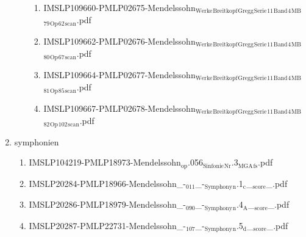 \documentclass[11pt]{article}
\begin{document}
\begin{enumerate}
\begin{enumerate}
\begin{enumerate}
\item IMSLP109660-PMLP02675-Mendelssohn$_{\text{Werke}}$$_{\text{Breitkopf}}$$_{\text{Gregg}}$$_{\text{Serie}}$$_{\text{11}}$$_{\text{Band}}$$_{\text{4}}$$_{\text{MB}}$$_{\text{79}}$$_{\text{Op}}$$_{\text{62}}$$_{\text{scan}}$.pdf
\label{sec-1-1-1-1-44-45-2-2-5}

\item IMSLP109662-PMLP02676-Mendelssohn$_{\text{Werke}}$$_{\text{Breitkopf}}$$_{\text{Gregg}}$$_{\text{Serie}}$$_{\text{11}}$$_{\text{Band}}$$_{\text{4}}$$_{\text{MB}}$$_{\text{80}}$$_{\text{Op}}$$_{\text{67}}$$_{\text{scan}}$.pdf
\label{sec-1-1-1-1-44-45-2-2-6}

\item IMSLP109664-PMLP02677-Mendelssohn$_{\text{Werke}}$$_{\text{Breitkopf}}$$_{\text{Gregg}}$$_{\text{Serie}}$$_{\text{11}}$$_{\text{Band}}$$_{\text{4}}$$_{\text{MB}}$$_{\text{81}}$$_{\text{Op}}$$_{\text{85}}$$_{\text{scan}}$.pdf
\label{sec-1-1-1-1-44-45-2-2-7}

\item IMSLP109667-PMLP02678-Mendelssohn$_{\text{Werke}}$$_{\text{Breitkopf}}$$_{\text{Gregg}}$$_{\text{Serie}}$$_{\text{11}}$$_{\text{Band}}$$_{\text{4}}$$_{\text{MB}}$$_{\text{82}}$$_{\text{Op}}$$_{\text{102}}$$_{\text{scan}}$.pdf
\label{sec-1-1-1-1-44-45-2-2-8}
\end{enumerate}
\end{enumerate}

\item symphonien
\label{sec-1-1-1-1-44-45-3}
\begin{enumerate}
\item IMSLP104219-PMLP18973-Mendelssohn$_{\text{op}}$.056$_{\text{Sinfonie}}$$_{\text{Nr}}$.3$_{\text{MGA}}$$_{\text{fs}}$.pdf
\label{sec-1-1-1-1-44-45-3-1}

\item IMSLP20284-PMLP18966-Mendelssohn\_-$_{\text{011}}$\_-$_{\text{Symphony}}$$_{\text{n}}$.1$_{\text{c}}$\_$_{\text{score}}$\_.pdf
\label{sec-1-1-1-1-44-45-3-2}

\item IMSLP20286-PMLP18979-Mendelssohn\_-$_{\text{090}}$\_-$_{\text{Symphony}}$$_{\text{n}}$.4$_{\text{A}}$\_$_{\text{score}}$\_.pdf
\label{sec-1-1-1-1-44-45-3-3}

\item IMSLP20287-PMLP22731-Mendelssohn\_-$_{\text{107}}$\_-$_{\text{Symphony}}$$_{\text{n}}$.5$_{\text{d}}$\_$_{\text{score}}$\_.pdf
\label{sec-1-1-1-1-44-45-3-4}


\end{enumerate}
\end{enumerate}
\end{document}
